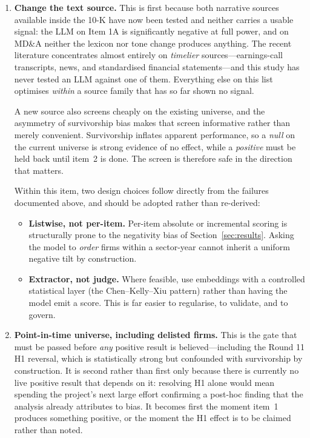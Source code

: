 \documentclass[11pt]{article}
\begin{document}
\begin{enumerate}[leftmargin=1.6em,itemsep=0.3em]

  \item \textbf{Change the text source.} This is first because both narrative sources
        available inside the 10-K have now been tested and neither carries a usable
        signal: the LLM on Item 1A is significantly negative at full power, and on MD\&A
        neither the lexicon nor tone change produces anything. The recent literature
        concentrates almost entirely on \emph{timelier} sources---earnings-call
        transcripts, news, and standardised financial statements---and this study has
        never tested an LLM against one of them. Everything else on this list optimises
        \emph{within} a source family that has so far shown no signal.

        A new source also screens cheaply on the existing universe, and the asymmetry of
        survivorship bias makes that screen informative rather than merely convenient.
        Survivorship inflates apparent performance, so a \emph{null} on the current
        universe is strong evidence of no effect, while a \emph{positive} must be held
        back until item~2 is done. The screen is therefore safe in the direction that
        matters.

        Within this item, two design choices follow directly from the failures documented
        above, and should be adopted rather than re-derived:
        \begin{itemize}[leftmargin=1.3em,itemsep=0.1em,topsep=0.25em]
          \item \textbf{Listwise, not per-item.} Per-item absolute or incremental scoring
                is structurally prone to the negativity bias of Section~\ref{sec:results}.
                Asking the model to \emph{order} firms within a sector-year cannot inherit
                a uniform negative tilt by construction.
          \item \textbf{Extractor, not judge.} Where feasible, use embeddings with a
                controlled statistical layer (the Chen--Kelly--Xiu pattern) rather than
                having the model emit a score. This is far easier to regularise, to
                validate, and to govern.
        \end{itemize}

  \item \textbf{Point-in-time universe, including delisted firms.} This is the gate that
        must be passed before \emph{any} positive result is believed---including the
        Round 11 H1 reversal, which is statistically strong but confounded with
        survivorship by construction. It is second rather than first only because there
        is currently no live positive result that depends on it: resolving H1 alone would
        mean spending the project's next large effort confirming a post-hoc finding that
        the analysis already attributes to bias. It becomes first the moment item~1
        produces something positive, or the moment the H1 effect is to be claimed rather
        than noted.


\end{enumerate}
\end{document}
